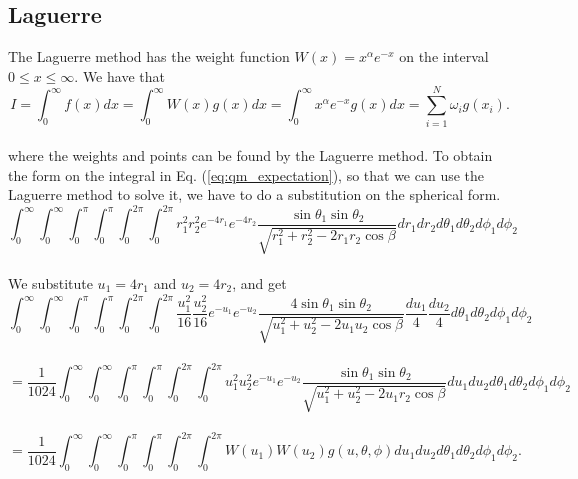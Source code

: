 \documentclass[12pt]{article}
\begin{document}
\begin{flushleft}
\newpage
\subsection{Laguerre}
The Laguerre method has the weight function $W(x) = x^{\alpha}e^{-x}$ on the interval $0\leq x\leq\infty$. We have that \\
\vspace{5mm}
$$I = \int_{0}^\infty f(x)dx = \int_{0}^\infty W(x)g(x)dx = \int_{0}^\infty x^{\alpha}e^{-x}g(x)dx = \sum\limits_{i=1}^N \omega_i g(x_i).$$\\   
\vspace{5mm}
where the weights and points can be found by the Laguerre method. To obtain the form on the integral in Eq. (\ref{eq:qm_expectation}), so that we can use the Laguerre method to solve it, we have to do a substitution on the spherical form.
\vspace{5mm}
\begin{equation}\label{eq:sph_expectation}
\int_{0}^{\infty}\int_{0}^{\infty}\int_{0}^{\pi}\int_{0}^{\pi}\int_{0}^{2\pi}\int_{0}^{2\pi}r_1^2r_2^2e^{-4r_1}e^{-4r_2}\frac{\sin\theta_1\sin\theta_2}{\sqrt{r_1^2+r_2^2-2r_1r_2\cos\beta}}dr_1dr_2d\theta_1d\theta_2d\phi_1d\phi_2
\end{equation}\\
\vspace{5mm}
We substitute $u_1 = 4r_1$ and $u_2= 4r_2$, and get
\vspace{5mm}
$$\int_{0}^{\infty}\int_{0}^{\infty}\int_{0}^{\pi}\int_{0}^{\pi}\int_{0}^{2\pi}\int_{0}^{2\pi}\frac{u_1^2}{16}\frac{u_2^2}{16} e^{-u_1}e^{-u_2}\frac{4\sin\theta_1\sin\theta_2}{\sqrt{u_1^2+u_2^2-2u_1u_2\cos\beta}}\frac{du_1}{4}\frac{du_2}{4} d\theta_1d\theta_2d\phi_1d\phi_2$$\\
\vspace{5mm}
\begin{equation}\label{eq:sph_integrand}
 = \frac{1}{1024}\int_{0}^{\infty}\int_{0}^{\infty}\int_{0}^{\pi}\int_{0}^{\pi}\int_{0}^{2\pi}\int_{0}^{2\pi}u_1^2u_2^2e^{-u_1}e^{-u_2}\frac{\sin\theta_1\sin\theta_2}{\sqrt{u_1^2+u_2^2-2u_1r_2\cos\beta}}du_1du_2d\theta_1d\theta_2d\phi_1d\phi_2
 \end{equation}\\
\vspace{5mm}
$$= \frac{1}{1024}\int_{0}^{\infty}\int_{0}^{\infty}\int_{0}^{\pi}\int_{0}^{\pi}\int_{0}^{2\pi}\int_{0}^{2\pi}W(u_1)W(u_2)g(u,\theta,\phi)du_1du_2d\theta_1d\theta_2d\phi_1d\phi_2.$$\\
\vspace{5mm}

\end{flushleft}
\end{document}
